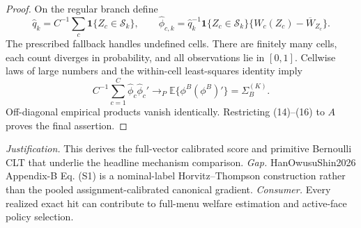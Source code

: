 \documentclass{article}
\begin{document}
\begin{proof}
On the regular branch define
\[
 \widehat q_k=C^{-1}\sum_c\mathbf1\{Z_c\in\mathcal S_k\},\qquad
 \widehat\phi_{c,k}=\widehat q_k^{-1}\mathbf1\{Z_c\in\mathcal S_k\}
 \{W_c(Z_c)-\overline W_{Z_c}\}.
\]
The prescribed fallback handles undefined cells.  There are finitely many cells, each count diverges in probability, and all observations lie in \([0,1]\).  Cellwise laws of large numbers and the within-cell least-squares identity imply
\[
 C^{-1}\sum_{c=1}^C\widehat\phi_c\widehat\phi_c'\to_P
 \mathbb E\{\phi^B(\phi^B)'\}=\Sigma_B^{(K)}. \tag{16}
\]
Off-diagonal empirical products vanish identically.  Restricting (14)--(16) to \(A\) proves the final assertion.
\end{proof}
\par\smallskip\noindent \textit{Justification.} This derives the full-vector calibrated score and primitive Bernoulli CLT that underlie the headline mechanism comparison. \textit{Gap.} HanOwusuShin2026 Appendix-B Eq. (S1) is a nominal-label Horvitz--Thompson construction rather than the pooled assignment-calibrated canonical gradient. \textit{Consumer.} Every realized exact hit can contribute to full-menu welfare estimation and active-face policy selection.
\end{document}
